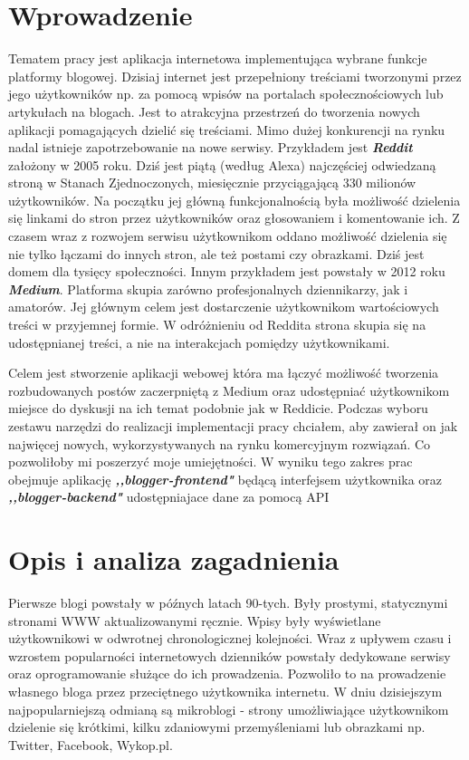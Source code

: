\documentclass[declaration,shortabstract]{iithesis}
\author         {}
\date          {}                     %
\begin{document}

\chapter{Wprowadzenie}
Tematem pracy jest aplikacja internetowa implementująca wybrane funkcje platformy blogowej. Dzisiaj internet jest przepełniony treściami tworzonymi przez jego użytkowników np. za pomocą wpisów na portalach społecznościowych lub artykułach na blogach. Jest to atrakcyjna przestrzeń do tworzenia nowych aplikacji pomagających dzielić się treściami. Mimo dużej konkurencji na rynku nadal istnieje zapotrzebowanie na nowe serwisy. Przykładem jest \textit{\textbf{Reddit}} założony w 2005 roku. Dziś jest piątą (według Alexa) najczęściej odwiedzaną stroną w Stanach Zjednoczonych, miesięcznie przyciągającą 330 milionów użytkowników. Na początku jej główną funkcjonalnością była możliwość dzielenia się linkami do stron przez użytkowników oraz głosowaniem i komentowanie ich. Z czasem wraz z rozwojem serwisu użytkownikom oddano możliwość dzielenia się nie tylko łączami do innych stron, ale też postami czy obrazkami. Dziś jest domem dla tysięcy społeczności. Innym przykładem jest powstały w 2012 roku \textit{\textbf{Medium}}. Platforma skupia zarówno profesjonalnych dziennikarzy, jak i amatorów. Jej głównym celem jest dostarczenie użytkownikom wartościowych treści w przyjemnej formie. W odróżnieniu od Reddita strona skupia się na udostępnianej treści, a nie na interakcjach pomiędzy użytkownikami. 

Celem jest stworzenie aplikacji webowej która ma łączyć możliwość tworzenia rozbudowanych postów zaczerpniętą z Medium oraz udostępniać użytkownikom miejsce do dyskusji na ich temat podobnie jak w Reddicie. Podczas wyboru zestawu narzędzi do realizacji implementacji pracy chciałem, aby zawierał on jak najwięcej nowych, wykorzystywanych na rynku komercyjnym rozwiązań. Co pozwoliłoby mi poszerzyć moje umiejętności. W wyniku tego zakres prac obejmuje aplikację \textbf{\textit{,,blogger-frontend"}} będącą interfejsem użytkownika oraz \textbf{\textit{,,blogger-backend"}} udostępniajace dane za pomocą API

\chapter{Opis i analiza zagadnienia}

Pierwsze blogi powstały w późnych latach 90-tych. Były prostymi, statycznymi stronami WWW aktualizowanymi ręcznie. Wpisy były wyświetlane użytkownikowi w odwrotnej chronologicznej kolejności. Wraz z upływem czasu i wzrostem popularności internetowych dzienników powstały dedykowane serwisy oraz oprogramowanie służące do ich prowadzenia. Pozwoliło to na prowadzenie własnego bloga przez przeciętnego użytkownika internetu. W dniu dzisiejszym najpopularniejszą odmianą są mikroblogi - strony umożliwiające użytkownikom dzielenie się krótkimi, kilku zdaniowymi przemyśleniami lub obrazkami np. Twitter, Facebook, Wykop.pl.
\end{document}
